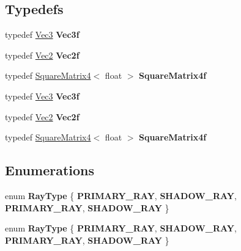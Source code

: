 \subsection*{Typedefs}
\begin{DoxyCompactItemize}
\item 
typedef \hyperlink{class_vec3}{Vec3} {\bfseries Vec3f}\hypertarget{group__linear__algebra_ga826e11f7e1e44c9038dc9cc7747b5067}{}\label{group__linear__algebra_ga826e11f7e1e44c9038dc9cc7747b5067}

\item 
typedef \hyperlink{class_vec2}{Vec2} {\bfseries Vec2f}\hypertarget{group__linear__algebra_gabe2f61ad7a1f5cdfd77e55822d77ec77}{}\label{group__linear__algebra_gabe2f61ad7a1f5cdfd77e55822d77ec77}

\item 
typedef \hyperlink{class_square_matrix4}{Square\+Matrix4}$<$ float $>$ {\bfseries Square\+Matrix4f}\hypertarget{group__linear__algebra_gad2b85d4d9fb5b5e4deaf20bff9595185}{}\label{group__linear__algebra_gad2b85d4d9fb5b5e4deaf20bff9595185}

\item 
typedef \hyperlink{class_vec3}{Vec3} {\bfseries Vec3f}\hypertarget{group__linear__algebra_ga826e11f7e1e44c9038dc9cc7747b5067}{}\label{group__linear__algebra_ga826e11f7e1e44c9038dc9cc7747b5067}

\item 
typedef \hyperlink{class_vec2}{Vec2} {\bfseries Vec2f}\hypertarget{group__linear__algebra_gabe2f61ad7a1f5cdfd77e55822d77ec77}{}\label{group__linear__algebra_gabe2f61ad7a1f5cdfd77e55822d77ec77}

\item 
typedef \hyperlink{class_square_matrix4}{Square\+Matrix4}$<$ float $>$ {\bfseries Square\+Matrix4f}\hypertarget{group__linear__algebra_gad2b85d4d9fb5b5e4deaf20bff9595185}{}\label{group__linear__algebra_gad2b85d4d9fb5b5e4deaf20bff9595185}

\end{DoxyCompactItemize}
\subsection*{Enumerations}
\begin{DoxyCompactItemize}
\item 
enum {\bfseries Ray\+Type} \{ {\bfseries P\+R\+I\+M\+A\+R\+Y\+\_\+\+R\+AY}, 
{\bfseries S\+H\+A\+D\+O\+W\+\_\+\+R\+AY}, 
{\bfseries P\+R\+I\+M\+A\+R\+Y\+\_\+\+R\+AY}, 
{\bfseries S\+H\+A\+D\+O\+W\+\_\+\+R\+AY}
 \}\hypertarget{group__linear__algebra_ga1d5111b9fffd76014406e866c8784459}{}\label{group__linear__algebra_ga1d5111b9fffd76014406e866c8784459}

\item 
enum {\bfseries Ray\+Type} \{ {\bfseries P\+R\+I\+M\+A\+R\+Y\+\_\+\+R\+AY}, 
{\bfseries S\+H\+A\+D\+O\+W\+\_\+\+R\+AY}, 
{\bfseries P\+R\+I\+M\+A\+R\+Y\+\_\+\+R\+AY}, 
{\bfseries S\+H\+A\+D\+O\+W\+\_\+\+R\+AY}
 \}\hypertarget{group__linear__algebra_ga1d5111b9fffd76014406e866c8784459}{}\label{group__linear__algebra_ga1d5111b9fffd76014406e866c8784459}

\end{DoxyCompactItemize}
